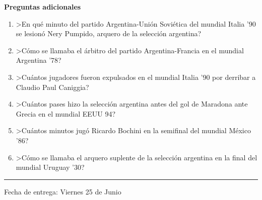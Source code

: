 \textbf{Preguntas adicionales}

\begin{enumerate}
\item >En qu\'e minuto del partido Argentina-Uni\'on Sovi\'etica del mundial
Italia '90 se lesion\'o Nery Pumpido, arquero de la selecci\'on
argentina?

\item >C\'omo se llamaba el \'arbitro del partido Argentina-Francia en
el mundial Argentina '78?

\item >Cu\'antos jugadores fueron expulsados en el mundial Italia '90
por derribar a Claudio Paul Caniggia?

\item >Cu\'antos pases hizo la selecci\'on argentina antes del gol de Maradona
ante Grecia en el mundial EEUU 94?

\item >Cu\'antos minutos jug\'o Ricardo Bochini en la semifinal del
mundial M\'exico '86?

\item >C\'omo se llamaba el arquero suplente de la selecci\'on argentina
en la final del mundial Uruguay '30?
\end{enumerate}

\vskip 15pt

\hrule

\vskip 11pt

Fecha de entrega: Viernes 25 de Junio
